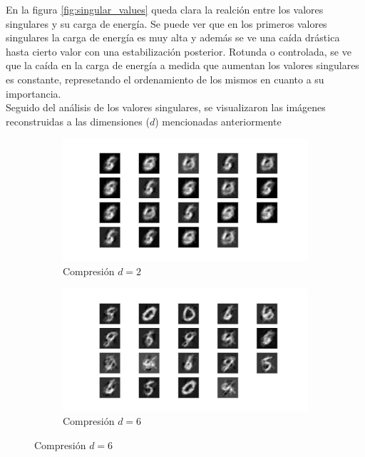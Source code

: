 \documentclass[12pt,a4]{article} %
\begin{document}
En la figura \ref{fig:singular_values} queda clara la realción entre los valores singulares y su carga de energía. Se puede ver que en los primeros valores singulares la carga de energía es muy alta y además se ve una caída drástica hasta cierto valor con una estabilización posterior. Rotunda o controlada, se ve que la caída en la carga de energía a medida que aumentan los valores singulares es constante, represetando el ordenamiento de los mismos en cuanto a su importancia.
\\

Seguido del análisis de los valores singulares, se visualizaron las imágenes reconstruidas a las dimensiones ($d$) mencionadas anteriormente

\begin{figure}[H]
    \centering
    \begin{subfigure}{0.45\textwidth}
        \includegraphics[width=\linewidth]{latex_project/Graficos_ej2/compression_2.jpeg}
        \caption{Compresión $d = 2$}
        \label{fig:d2}
    \end{subfigure}
    \hfill
    \begin{subfigure}{0.45\textwidth}
        \includegraphics[width=\linewidth]{latex_project/Graficos_ej2/compression_6.jpeg}
        \caption{Compresión $d = 6$}

\end{subfigure}
\end{figure}
\end{document}
